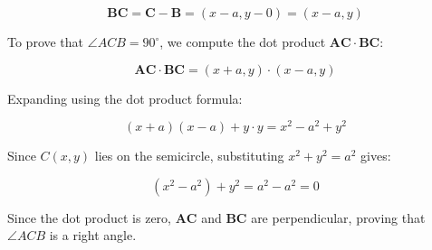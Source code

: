 \documentclass[12pt]{article}
\begin{document}
\begin{enumerate}
\[
\mathbf{BC} = \mathbf{C} - \mathbf{B} = (x - a, y - 0) = (x - a, y)
\]

To prove that \( \angle ACB = 90^\circ \), we compute the dot product \( \mathbf{AC} \cdot \mathbf{BC} \):

\[
\mathbf{AC} \cdot \mathbf{BC} = (x + a, y) \cdot (x - a, y)
\]

Expanding using the dot product formula:

\[
(x + a)(x - a) + y \cdot y = x^2 - a^2 + y^2
\]

Since \( C(x,y) \) lies on the semicircle, substituting \( x^2 + y^2 = a^2 \) gives:

\[
(x^2 - a^2) + y^2 = a^2 - a^2 = 0
\]

Since the dot product is zero, \( \mathbf{AC} \) and \( \mathbf{BC} \) are perpendicular, proving that \( \angle ACB \) is a right angle.

\end{enumerate}
\end{document}
